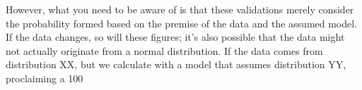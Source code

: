 \documentclass{ltjsbook}
\begin{document}
{%
However, what you need to be aware of is that these validations merely consider the probability formed based on the premise of the data and the assumed model. If the data changes, so will these figures; it's also possible that the data might not actually originate from a normal distribution. If the data comes from distribution XX, but we calculate with a model that assumes distribution YY, proclaiming a 100%


}
\end{document}
